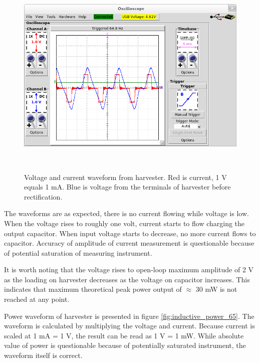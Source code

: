 \begin{figure}[htb]
\begin{center}
\includegraphics[height=10cm]{images/own_measurement/generator_shaker/inductive_td_harvesting_vi_65hz_ferro.png}
\end{center}
\caption{\label{fig:inductive_vi_65} Voltage and current waveform from harvester. Red is current, 1 V equals 1 mA. Blue is voltage from the terminals of harvester before rectification.}
\end{figure}

The waveforms are as expected, there is no current flowing while voltage is low. When the voltage rises to roughly one volt, current starts to flow charging the output capacitor. When input voltage starts to decrease, no more current flows to capacitor. Accuracy of amplitude of current measurement is questionable because of potential saturation of measuring instrument.

It is worth noting that the voltage rises to open-loop maximum amplitude of 2 V as the loading on harvester decreases as the voltage on capacitor increases. This indicates that maximum theoretical peak power output of $\approx$ 30 mW is not reached at any point. 

Power waveform of harvester is presented in figure \ref{fig:inductive_power_65}. The waveform is calculated by multiplying the voltage and current. Because current is scaled at 1 mA = 1 V, the result can be read as 1 V = 1 mW. While absolute value of power is questionable because of potentially saturated instrument, the waveform itself is correct.  


